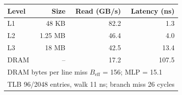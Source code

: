 \begin{tabular}{lrrr}
\toprule
Level & Size & Read (GB/s) & Latency (ns) \\
\midrule
L1 & 48 KB & 82.2 & 1.3 \\
L2 & 1.25 MB & 46.4 & 4.0 \\
L3 & 18 MB & 42.5 & 13.4 \\
DRAM & -- & 17.2 & 107.5 \\
\midrule
\multicolumn{4}{l}{DRAM bytes per line miss $B_{\mathrm{eff}}$ = 156; MLP = 15.1} \\
\multicolumn{4}{l}{TLB 96/2048 entries, walk 11 ns; branch miss 26 cycles} \\
\bottomrule
\end{tabular}
